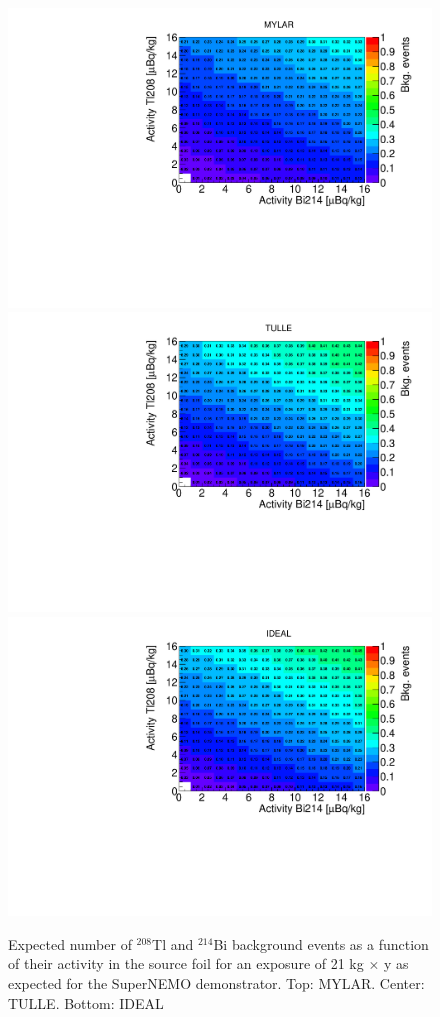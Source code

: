 \documentclass[main.tex]{subfiles}
\begin{document}
\begin{figure}[h!]
\centering
\includegraphics[scale=0.5]{pictures/Chap4/MYLAR_no2nu.pdf}
\includegraphics[scale=0.5]{pictures/Chap4/TULLE_no2nu.pdf}
\includegraphics[scale=0.5]{pictures/Chap4/IDEAL_no2nu.pdf}
\caption{Expected number of $^{\text{208}}$Tl and $^{\text{214}}$Bi background events as a function of their activity in the source foil for an exposure of 21 kg $\times$ y as expected for the SuperNEMO demonstrator. Top: MYLAR. Center: TULLE. Bottom: IDEAL}
\label{Nbkg_3designs}
\end{figure}
\end{document}
